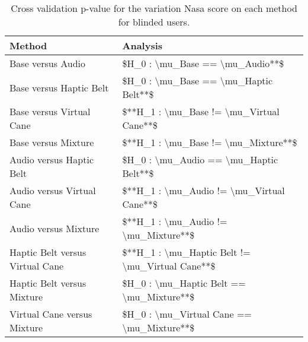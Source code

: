 
\begin{table}[!htb]
\centering
\caption{Cross validation p-value for the variation Nasa score on each method for blinded users.}
\label{tab:lsd_sagat_var}
\begin{tabular}{ll}
\toprule
                         Method &                                        Analysis \\
\midrule
              Base versus Audio &                 \$H\_0 : \textbackslash mu\_Base == \textbackslash mu\_Audio**\$ \\
        Base versus Haptic Belt &           \$H\_0 : \textbackslash mu\_Base == \textbackslash mu\_Haptic Belt**\$ \\
       Base versus Virtual Cane &        \$**H\_1 : \textbackslash mu\_Base != \textbackslash mu\_Virtual Cane**\$ \\
            Base versus Mixture &             \$**H\_1 : \textbackslash mu\_Base != \textbackslash mu\_Mixture**\$ \\
       Audio versus Haptic Belt &          \$H\_0 : \textbackslash mu\_Audio == \textbackslash mu\_Haptic Belt**\$ \\
      Audio versus Virtual Cane &       \$**H\_1 : \textbackslash mu\_Audio != \textbackslash mu\_Virtual Cane**\$ \\
           Audio versus Mixture &            \$**H\_1 : \textbackslash mu\_Audio != \textbackslash mu\_Mixture**\$ \\
Haptic Belt versus Virtual Cane & \$**H\_1 : \textbackslash mu\_Haptic Belt != \textbackslash mu\_Virtual Cane**\$ \\
     Haptic Belt versus Mixture &        \$H\_0 : \textbackslash mu\_Haptic Belt == \textbackslash mu\_Mixture**\$ \\
    Virtual Cane versus Mixture &       \$H\_0 : \textbackslash mu\_Virtual Cane == \textbackslash mu\_Mixture**\$ \\
\bottomrule
\end{tabular}
\end{table}

